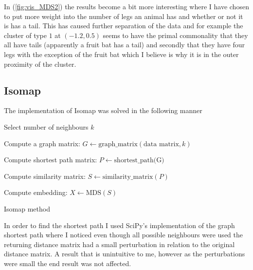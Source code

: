 In (\ref{fig:vis_MDS2}) the results become a bit more interesting where I have chosen to put more weight into the number of legs an animal has and whether or not it is has a tail. This has caused further separation of the data and for example the cluster of type $1$ at $(-1.2,0.5)$ seems to have the primal commonality that they all have tails (apparently a fruit bat has a tail) and secondly that they have four legs with the exception of the fruit bat which I believe is why it is in the outer proximity of the cluster.


\subsection*{Isomap}
The implementation of Isomap was solved in the following manner

\begin{algorithm}[H]
\SetAlgoLined
{}
  Select number of neighbours $k$

  Compute a graph matrix: $G \gets \text{graph\_matrix}(\text{data matrix}, k)$

  Compute shortest path matrix: $P \gets \text{shortest\_path(G)}$

  Compute similarity matrix: $S \gets \text{similarity\_matrix} (P)$

  Compute embedding: $X \gets \text{MDS}(S)$
 \caption{Isomap method}
\end{algorithm}

In order to find the shortest path I used SciPy's implementation of the graph shortest path where I noticed even though all possible neighbours were used the returning distance matrix had a small perturbation in relation to the original distance matrix. A result that is unintuitive to me, however as the perturbations were small the end result was not affected.

